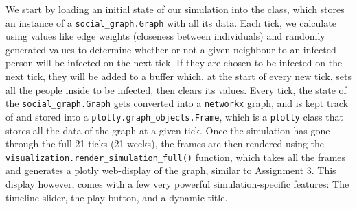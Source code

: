 \documentclass[fontsize=11pt]{article}
\newcommand{\ttt}[1]{\texttt{#1}}
\begin{document}
    We start by loading an initial state of our simulation into the class, which stores an instance of a \ttt{social\_graph.Graph} with all its data. Each tick, we calculate using values like edge weights (closeness between individuals) and randomly generated values to determine whether or not a given neighbour to an infected person will be infected on the next tick. If they are chosen to be infected on the next tick, they will be added to a buffer which, at the start of every new tick, sets all the people inside to be infected, then clears its values. Every tick, the state of the \ttt{social\_graph.Graph} gets converted into a \ttt{networkx} graph, and is kept track of and stored into a \ttt{plotly.graph\_objects.Frame}, which is a \ttt{plotly} class that stores all the data of the graph at a given tick. Once the simulation has gone through the full 21 ticks (21 weeks), the frames are then rendered using the \ttt{visualization.render\_simulation\_full()} function, which takes all the frames and generates a plotly web-display of the graph, similar to Assignment 3. This display however, comes with a few very powerful simulation-specific features: The timeline slider, the play-button, and a dynamic title.
    \newpage
\end{document}
